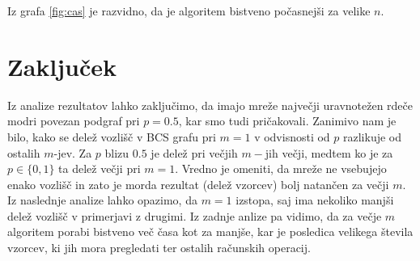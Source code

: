 \documentclass[a4paper, 11pt]{article}
\theoremstyle{definition}
\theoremstyle{definition}
\begin{document}
Iz grafa \ref{fig:cas} je razvidno, da je algoritem bistveno počasnejši za 
velike $n$.

\section{Zaključek}

Iz analize rezultatov lahko zaključimo, da imajo mreže največji 
uravnotežen rdeče modri povezan podgraf pri $p=0.5$, kar smo tudi
pričakovali. Zanimivo nam je bilo, kako se delež vozlišč v BCS 
grafu pri $m=1$ v odvisnosti od $p$ razlikuje od ostalih $m$-jev.
Za $p$ blizu $0.5$ je delež pri večjih $m-$jih večji, medtem ko je za 
$p \in \{ 0,1 \}$ ta delež večji pri $m=1$.
Vredno je omeniti, da mreže ne vsebujejo enako vozlišč in 
zato je morda rezultat (delež vzorcev) bolj natančen za večji $m$.
Iz naslednje analize lahko opazimo, da $m=1$ izstopa, saj 
ima nekoliko manjši delež vozlišč v primerjavi z drugimi.
Iz zadnje anlize pa vidimo, da za večje $m$ algoritem porabi bistveno
več časa kot za manjše, kar je posledica velikega števila vzorcev,
ki jih mora pregledati ter ostalih računskih operacij.  
\end{document}
